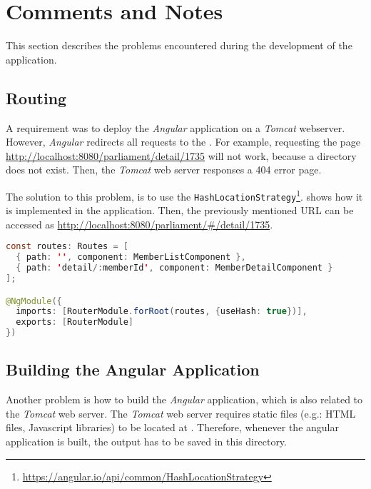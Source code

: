 \section{Comments and Notes}\label{sec:04_comments}
This section describes the problems encountered during the development of the application.


\subsection{Routing}\label{subsec:04_comments_routing}
A requirement was to deploy the \textit{Angular} application on a \textit{Tomcat} webserver. However, \textit{Angular} redirects all requests to the .
For example, requesting the page \url{http://localhost:8080/parliament/detail/1735} will not work, because a directory  does not exist. Then, the \textit{Tomcat} web server responses a 404 error page.

The solution to this problem, is to use the \texttt{HashLocationStrategy}\footnote{\url{https://angular.io/api/common/HashLocationStrategy}}.  shows how it is implemented in the application.
Then, the previously mentioned URL can be accessed as \url{http://localhost:8080/parliament/#/detail/1735}.
\begin{lstlisting}[label=lst:04_comments_routing_hashrouting, caption=Application routing configuration of \texttt{app-routing.module.ts}, language=java]
const routes: Routes = [
  { path: '', component: MemberListComponent },
  { path: 'detail/:memberId', component: MemberDetailComponent }
];

@NgModule({
  imports: [RouterModule.forRoot(routes, {useHash: true})],
  exports: [RouterModule]
})
\end{lstlisting}


\subsection{Building the Angular Application}\label{subsec:04_comments_building}
Another problem is how to build the \textit{Angular} application, which is also related to the \textit{Tomcat} web server.
The \textit{Tomcat} web server requires static files (e.g.: HTML files, Javascript libraries) to be located at .
Therefore, whenever the angular application is built, the output has to be saved in this directory.

